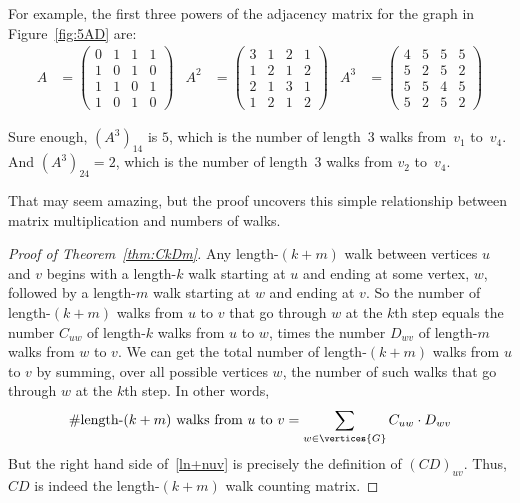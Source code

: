 For example, the first three powers of the adjacency matrix for the
graph in Figure~\ref{fig:5AD} are:
\begin{align*}
    A &= \begin{pmatrix}
            0 & 1 & 1 & 1 \\
            1 & 0 & 1 & 0 \\
            1 & 1 & 0 & 1 \\
            1 & 0 & 1 & 0
         \end{pmatrix} & %
  A^2 &= \begin{pmatrix}
            3 & 1 & 2 & 1 \\
            1 & 2 & 1 & 2 \\
            2 & 1 & 3 & 1 \\
            1 & 2 & 1 & 2
         \end{pmatrix} & %
  A^3 &= \begin{pmatrix}
            4 & 5 & 5 & 5 \\
            5 & 2 & 5 & 2 \\
            5 & 5 & 4 & 5 \\
            5 & 2 & 5 & 2
         \end{pmatrix}
\end{align*}

Sure enough, $(A^3)_{14}$ is $5$, which is the number of length~3 walks
from~$v_1$ to~$v_4$.  And $(A^3)_{24} = 2$, which is the number of
length~3 walks from $v_2$ to~$v_4$.  
\fi

That may seem amazing, but the proof uncovers this simple relationship
between matrix multiplication and numbers of walks.

\begin{editingnotes}
\end{editingnotes}

\begin{proof}[Proof of Theorem~\ref{thm:CkDm}]
  Any length-$(k+m)$ walk between vertices $u$ and $v$ begins with a
  length-$k$ walk starting at $u$ and ending at some vertex, $w$,
  followed by a length-$m$ walk starting at $w$ and ending at $v$.  So
  the number of length-$(k+m)$ walks from $u$ to $v$ that go through
  $w$ at the $k$th step equals the number $C_{uw}$ of length-$k$ walks
  from $u$ to $w$, times the number $D_{wv}$ of length-$m$ walks from
  $w$ to $v$.  We can get the total number of length-$(k+m)$ walks
  from $u$ to $v$ by summing, over all possible vertices $w$, the
  number of such walks that go through $w$ at the $k$th step.  In
  other words,
\begin{equation}\label{ln+nuv}
\text{\#length-$(k+m)$ walks from $u$ to $v$} =
              \sum_{w \in \vertices{G}} C_{uw}\cdot D_{wv}
\end{equation}
But the right hand side of~\eqref{ln+nuv} is precisely the definition of
$(CD)_{uv}$.  Thus, $CD$ is indeed the length-$(k+m)$ walk counting matrix.
\end{proof}


